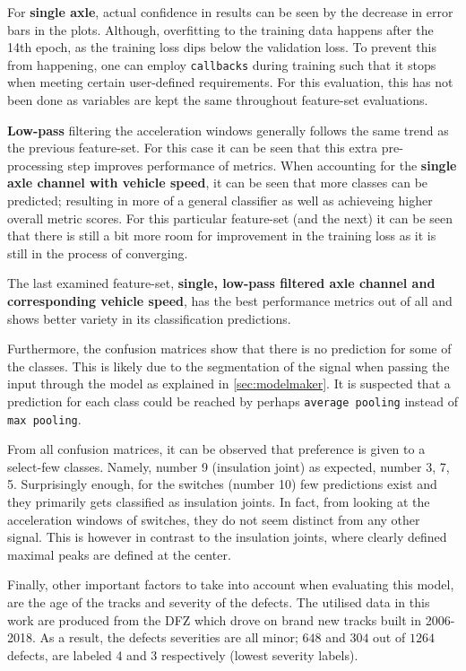 For \textbf{single axle}, actual confidence in results can be seen by the decrease in error bars in the plots. Although, overfitting to the training data happens after the 14th epoch, as the training loss dips below the validation loss. To prevent this from happening, one can employ \verb|callbacks| during training such that it stops when meeting certain user-defined requirements. For this evaluation, this has not been done as variables are kept the same throughout feature-set evaluations.

\textbf{Low-pass} filtering the acceleration windows generally follows the same trend as the previous feature-set. For this case it can be seen that this extra pre-processing step improves performance of metrics. When accounting for the \textbf{single axle channel with vehicle speed}, it can be seen that more classes can be predicted; resulting in more of a general classifier as well as achieveing higher overall metric scores. For this particular feature-set (and the next) it can be seen that there is still a bit more room for improvement in the training loss as it is still in the process of converging. 

The last examined feature-set, \textbf{single, low-pass filtered axle channel and corresponding vehicle speed}, has the best performance metrics out of all and shows better variety in its classification predictions.

Furthermore, the confusion matrices show that there is no prediction for some of the classes. This is likely due to the segmentation of the signal when passing the input through the model as explained in \ref{sec:modelmaker}. It is suspected that a prediction for each class could be reached by perhaps \verb|average pooling| instead of \verb|max pooling|. 

From all confusion matrices, it can be observed that preference is given to a select-few classes. Namely, number 9 (insulation joint) as expected, number 3, 7, 5. Surprisingly enough, for the switches (number 10) few predictions exist and they primarily gets classified as insulation joints. In fact, from looking at the acceleration windows of switches, they do not seem distinct from any other signal. This is however in contrast to the insulation joints, where clearly defined maximal peaks are defined at the center. 

Finally, other important factors to take into account when evaluating this model, are the age of the tracks and severity of the defects. The utilised data in this work are produced from the DFZ which drove on brand new tracks built in 2006-2018. As a result, the defects severities are all minor; $648$ and $304$ out of $1264$ defects, are labeled 4 and 3 respectively (lowest severity labels).

